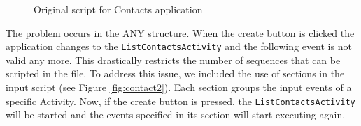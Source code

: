 \documentclass{acm_proc_article-sp}
\begin{document}
\begin{figure}
\vspace{-15pt}
\caption{Original script for Contacts application}
\label{fig:contact}
\end{figure}

The problem occurs in the ANY structure. When the create button is clicked the application changes to the \texttt{ListContactsActivity}
and the following event is not valid any more. This drastically restricts the number of sequences that can be scripted in the file. To
address this issue, we included the use of sections in the input script (see Figure \ref{fig:contact2}). Each section groups the input
events of a specific Activity. Now, if the create button is pressed, the \texttt{ListContactsActivity} will be started and the events
specified in its section will start executing again.
\end{document}
